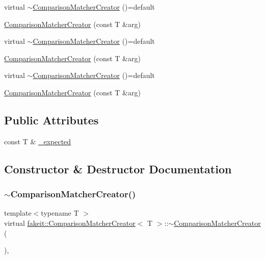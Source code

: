 \begin{DoxyCompactItemize}
virtual \mbox{\hyperlink{structfakeit_1_1ComparisonMatcherCreator_a68be48f2907df6717e3e3fd699150e32}{$\sim$\+Comparison\+Matcher\+Creator}} ()=default
\item 
\mbox{\hyperlink{structfakeit_1_1ComparisonMatcherCreator_ab8a8c71e965e7ab463c63fe514b3ce7a}{Comparison\+Matcher\+Creator}} (const T \&arg)
\item 
virtual \mbox{\hyperlink{structfakeit_1_1ComparisonMatcherCreator_a68be48f2907df6717e3e3fd699150e32}{$\sim$\+Comparison\+Matcher\+Creator}} ()=default
\item 
\mbox{\hyperlink{structfakeit_1_1ComparisonMatcherCreator_ab8a8c71e965e7ab463c63fe514b3ce7a}{Comparison\+Matcher\+Creator}} (const T \&arg)
\item 
virtual \mbox{\hyperlink{structfakeit_1_1ComparisonMatcherCreator_a68be48f2907df6717e3e3fd699150e32}{$\sim$\+Comparison\+Matcher\+Creator}} ()=default
\item 
\mbox{\hyperlink{structfakeit_1_1ComparisonMatcherCreator_ab8a8c71e965e7ab463c63fe514b3ce7a}{Comparison\+Matcher\+Creator}} (const T \&arg)
\end{DoxyCompactItemize}
\subsection*{Public Attributes}
\begin{DoxyCompactItemize}
\item 
const T \& \mbox{\hyperlink{structfakeit_1_1ComparisonMatcherCreator_aae212812867eabbf7d87267cc657afaf}{\+\_\+expected}}
\end{DoxyCompactItemize}


\subsection{Constructor \& Destructor Documentation}
\mbox{\label{structfakeit_1_1ComparisonMatcherCreator_a68be48f2907df6717e3e3fd699150e32}} 
\subsubsection{\texorpdfstring{$\sim$ComparisonMatcherCreator()}{~ComparisonMatcherCreator()}\hspace{0.1cm}{\footnotesize\ttfamily [1/9]}}
{\footnotesize\ttfamily template$<$typename T $>$ \\
virtual \mbox{\hyperlink{structfakeit_1_1ComparisonMatcherCreator}{fakeit\+::\+Comparison\+Matcher\+Creator}}$<$ T $>$\+::$\sim$\mbox{\hyperlink{structfakeit_1_1ComparisonMatcherCreator}{Comparison\+Matcher\+Creator}} (\begin{DoxyParamCaption}{ }\end{DoxyParamCaption})\hspace{0.3cm}{\ttfamily [virtual]}, {\ttfamily [default]}}

